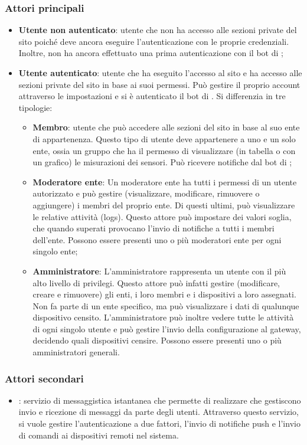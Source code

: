 		\subsubsection{Attori principali}
		\begin{itemize}
			\item \textbf{Utente non autenticato}: utente che non ha accesso alle sezioni private del sito poiché deve ancora eseguire l'autenticazione con le proprie credenziali. Inoltre, non ha ancora effettuato una prima autenticazione con il bot di ;

			\item \textbf{Utente autenticato}: utente che ha eseguito l'accesso al sito e ha accesso alle sezioni private del sito in base ai suoi permessi. Può gestire il proprio account attraverso le impostazioni e si è autenticato il bot di . Si differenzia in tre tipologie:

			\begin{itemize}
				\item \textbf{Membro}: utente che può accedere alle sezioni del sito in base al suo ente di appartenenza. Questo tipo di utente deve appartenere a uno e un solo ente, ossia un gruppo che ha il permesso di visualizzare (in tabella o con un grafico) le misurazioni dei sensori. Può ricevere notifiche dal bot di ;

				\item \textbf{Moderatore ente}: Un moderatore ente ha tutti i permessi di un utente autorizzato e può gestire (visualizzare, modificare, rimuovere o aggiungere) i membri del proprio ente. Di questi ultimi, può visualizzare le relative attività (logs).
				Questo attore può impostare dei valori soglia, che quando superati provocano l'invio di notifiche a tutti i membri dell'ente.
				Possono essere presenti uno o più moderatori ente per ogni singolo ente;

				\item \textbf{Amministratore}: L'amministratore rappresenta un utente con il più alto livello di privilegi. Questo attore può infatti gestire (modificare, creare e rimuovere) gli enti, i loro membri e i dispositivi a loro assegnati. Non fa parte di un ente specifico, ma può visualizzare i dati di qualunque dispositivo censito. 
				L'amministratore può inoltre vedere tutte le attività di ogni singolo utente e può gestire l'invio della configurazione al gateway, decidendo quali dispositivi censire.
				Possono essere presenti uno o più amministratori generali.
			\end{itemize}
		\end{itemize}
		\subsubsection{Attori secondari}
			\begin{itemize}
				\item {}: servizio di messaggistica istantanea che permette di realizzare  che gestiscono invio e ricezione di messaggi da parte degli utenti. Attraverso questo servizio, si vuole gestire l'autenticazione a due fattori, l'invio di notifiche push e l'invio di comandi ai dispositivi remoti nel sistema.
			\end{itemize}
	